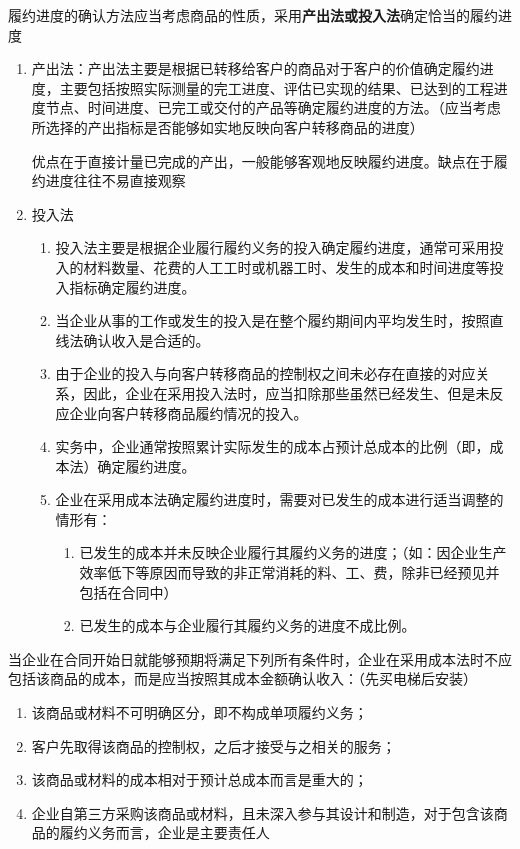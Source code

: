 \documentclass[UTF8,12pt]{ctexart}
\numberwithin{equation}{section} %
\numberwithin{figure}{section}
\numberwithin{table}{section}
\begin{document}
	履约进度的确认方法应当考虑商品的性质，采用\textbf{产出法或投入法}确定恰当的履约进度
	\begin{enumerate}
		\item 产出法：产出法主要是根据已转移给客户的商品对于客户的价值确定履约进度，主要包括按照实际测量的完工进度、评估已实现的结果、已达到的工程进度节点、时间进度、已完工或交付的产品等确定履约进度的方法。（应当考虑所选择的产出指标是否能够如实地反映向客户转移商品的进度）
		
		优点在于直接计量已完成的产出，一般能够客观地反映履约进度。缺点在于履约进度往往不易直接观察
		
		\item 投入法
		\begin{enumerate}
			\item 投入法主要是根据企业履行履约义务的投入确定履约进度，通常可采用投入的材料数量、花费的人工工时或机器工时、发生的成本和时间进度等投入指标确定履约进度。
			
			\item 当企业从事的工作或发生的投入是在整个履约期间内平均发生时，按照直线法确认收入是合适的。
			
			\item 由于企业的投入与向客户转移商品的控制权之间未必存在直接的对应关系，因此，企业在采用投入法时，应当扣除那些虽然已经发生、但是未反应企业向客户转移商品履约情况的投入。
			
			\item 实务中，企业通常按照累计实际发生的成本占预计总成本的比例（即，成本法）确定履约进度。
			
			\item 企业在采用成本法确定履约进度时，需要对已发生的成本进行适当调整的情形有：
			\begin{enumerate}
				\item 已发生的成本并未反映企业履行其履约义务的进度；（如：因企业生产效率低下等原因而导致的非正常消耗的料、工、费，除非已经预见并包括在合同中）
				
				\item 已发生的成本与企业履行其履约义务的进度不成比例。
			\end{enumerate}
		\end{enumerate}
	\end{enumerate}

	当企业在合同开始日就能够预期将满足下列所有条件时，企业在采用成本法时不应包括该商品的成本，而是应当按照其成本金额确认收入：（先买电梯后安装）
	\begin{enumerate}
		\item 该商品或材料不可明确区分，即不构成单项履约义务；
		
		\item 客户先取得该商品的控制权，之后才接受与之相关的服务；
		
		\item 该商品或材料的成本相对于预计总成本而言是重大的；
		
		\item 企业自第三方采购该商品或材料，且未深入参与其设计和制造，对于包含该商品的履约义务而言，企业是主要责任人
	\end{enumerate}
\end{document}
